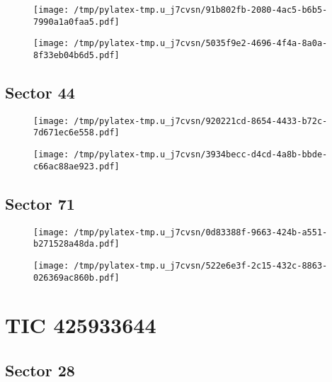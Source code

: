 \documentclass{report}%
\begin{document}
\begin{figure}[H]%
\centering%
\centering%
\texttt{[image: /tmp/pylatex-tmp.u\_j7cvsn/91b802fb-2080-4ac5-b6b5-7990a1a0faa5.pdf]}%
\end{figure}

%


\begin{figure}[H]%
\centering%
\texttt{[image: /tmp/pylatex-tmp.u\_j7cvsn/5035f9e2-4696-4f4a-8a0a-8f33eb04b6d5.pdf]}%
\end{figure}

%
\subsection{Sector 44}%
\label{subsec:5983663344}%


\begin{figure}[H]%
\centering%
\centering%
\texttt{[image: /tmp/pylatex-tmp.u\_j7cvsn/920221cd-8654-4433-b72c-7d671ec6e558.pdf]}%
\end{figure}

%


\begin{figure}[H]%
\centering%
\texttt{[image: /tmp/pylatex-tmp.u\_j7cvsn/3934becc-d4cd-4a8b-bbde-c66ac88ae923.pdf]}%
\end{figure}

%
\subsection{Sector 71}%
\label{subsec:5983663371}%


\begin{figure}[H]%
\centering%
\centering%
\texttt{[image: /tmp/pylatex-tmp.u\_j7cvsn/0d83388f-9663-424b-a551-b271528a48da.pdf]}%
\end{figure}

%


\begin{figure}[H]%
\centering%
\texttt{[image: /tmp/pylatex-tmp.u\_j7cvsn/522e6e3f-2c15-432c-8863-026369ac860b.pdf]}%
\end{figure}

%
\section{TIC 425933644}%
\label{sec:TIC425933644}%
\subsection{Sector 28}%
\label{subsec:42593364428}%
\end{document}
